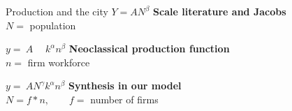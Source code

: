 \documentclass[notes=show]{beamer} %
\begin{document}
\begin{frame}{Production and the city}
\huge 
$Y=AN^\beta$ {\normalsize \hfill \textbf{Scale literature and Jacobs}\\\hfill $N =$ population}
\vspace{.5cm}

$y=\:A\quad \;k^\alpha n^\beta$ {\normalsize \hfill \textbf{Neoclassical production function}\\ \hfill$n =$ firm workforce}
\vspace{.5cm}

$y=\:AN^\gamma k^\alpha n^\beta$ {\normalsize \hfill \textbf{Synthesis in our model}\\\hfill $N = f*n, \qquad f=$ number of firms}
\end{frame}
\end{document}
